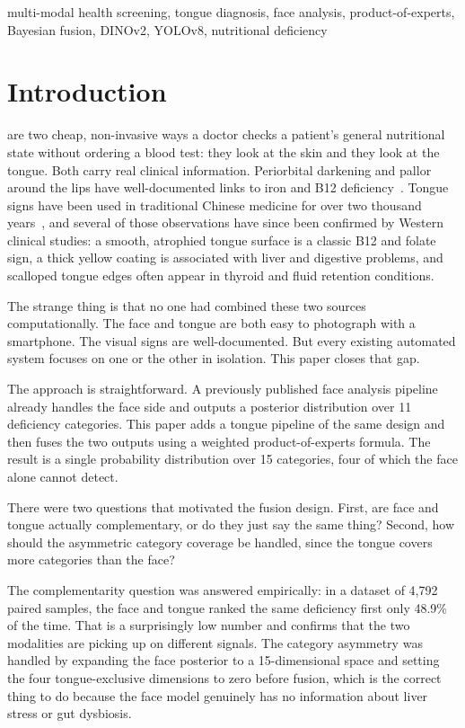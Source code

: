 \documentclass[journal]{IEEEtran}
\begin{document}
\begin{IEEEkeywords}
multi-modal health screening, tongue diagnosis, face analysis,
product-of-experts, Bayesian fusion, DINOv2, YOLOv8, nutritional deficiency
\end{IEEEkeywords}

\section{Introduction}
\label{sec:intro}

 are two cheap, non-invasive ways a doctor checks a
patient's general nutritional state without ordering a blood test: they look
at the skin and they look at the tongue. Both carry real clinical information.
Periorbital darkening and pallor around the lips have well-documented links
to iron and B12 deficiency~\cite{sarkar2016}. Tongue signs have been used
in traditional Chinese medicine for over two thousand years~\cite{chen2011},
and several of those observations have since been confirmed by Western clinical
studies: a smooth, atrophied tongue surface is a classic B12 and folate sign,
a thick yellow coating is associated with liver and digestive problems, and
scalloped tongue edges often appear in thyroid and fluid retention conditions.

The strange thing is that no one had combined these two sources
computationally. The face and tongue are both easy to photograph with a
smartphone. The visual signs are well-documented. But every existing automated
system focuses on one or the other in isolation. This paper closes that gap.

The approach is straightforward. A previously published face analysis pipeline
\cite{muhammad2026facefuel} already handles the face side and outputs a posterior
distribution over 11 deficiency categories. This paper adds a tongue pipeline
of the same design and then fuses the two outputs using a weighted
product-of-experts formula. The result is a single probability distribution
over 15 categories, four of which the face alone cannot detect.

There were two questions that motivated the fusion design. First, are face and
tongue actually complementary, or do they just say the same thing? Second, how
should the asymmetric category coverage be handled, since the tongue covers more
categories than the face?

The complementarity question was answered empirically: in a dataset of 4{,}792
paired samples, the face and tongue ranked the same deficiency first only
48.9\% of the time. That is a surprisingly low number
and confirms that the two modalities are picking up on different signals. The
category asymmetry was handled by expanding the face posterior to a 15-dimensional
space and setting the four tongue-exclusive dimensions to zero before fusion,
which is the correct thing to do because the face model genuinely has no
information about liver stress or gut dysbiosis.
\end{document}
